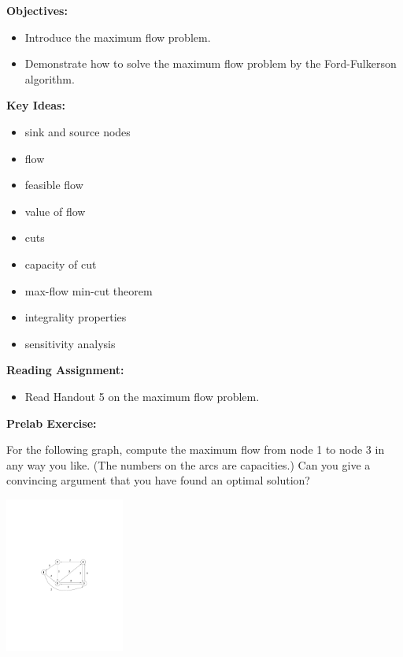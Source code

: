 \documentclass[twoside]{article}%
\begin{document}

\noindent
\textbf{Objectives:}

\begin{itemize}
\item Introduce the maximum flow problem.
\item Demonstrate how to solve the maximum flow problem by the
  Ford-Fulkerson algorithm.
\end{itemize}

\noindent
\textbf{Key Ideas:}

\begin{minipage}[t]{.45\linewidth}
  \begin{itemize}
  \item sink and source nodes
  \item flow
  \item feasible flow
  \item value of flow
  \item cuts
  \end{itemize}  
\end{minipage}
\hfill
\begin{minipage}[t]{.45\linewidth}
  \begin{itemize}
  \item capacity of cut
  \item max-flow min-cut theorem
  \item integrality properties
  \item sensitivity analysis
  \end{itemize}
\end{minipage}

\vspace{1em}

\noindent
\textbf{Reading Assignment:}
\begin{itemize}
\item
Read Handout 5 on the maximum flow problem.
\end{itemize}

\noindent
\textbf{Prelab Exercise:}


\noindent
For the following graph, compute the maximum flow from node 1 to node
3 in any way you like. (The numbers on the arcs are capacities.) Can you give a convincing argument that you
have found an optimal solution?

\bigskip

\begin{center}
\includegraphics[height= 2in]{prelab4_fig1.pdf}
\end{center}
\end{document}
